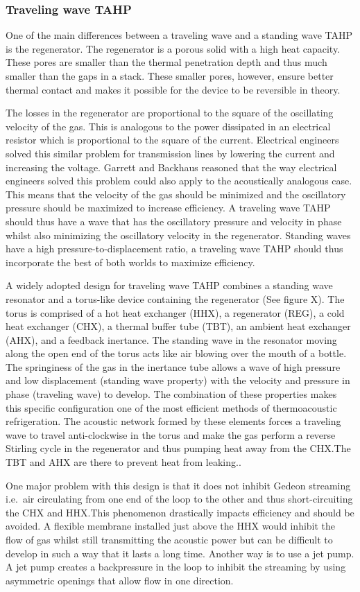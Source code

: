 \documentclass{article}
\newcommand{\newpara}
    {
      \bigbreak{}
      \noindent
    }
\begin{document}
\subsubsection{Traveling wave TAHP\cite{TARTIBU2019102}}
One of the main differences between a traveling wave and a standing wave TAHP is the regenerator. The regenerator is a porous solid with a high heat capacity. These pores are smaller than the thermal penetration depth and thus much smaller than the gaps in a stack. These smaller pores, however, ensure better thermal contact and makes it possible for the device to be reversible in theory.
\newpara{}
The losses in the regenerator are proportional to the square of the oscillating velocity of the gas. This is analogous to the power dissipated in an electrical resistor which is proportional to the square of the current. Electrical engineers solved this similar problem for transmission lines by lowering the current and increasing the voltage. Garrett and Backhaus\cite{powerofsound} reasoned that the way electrical engineers solved this problem could also apply to the acoustically analogous case. This means that the velocity of the gas should be minimized and the oscillatory pressure should be maximized to increase efficiency. A traveling wave TAHP should thus have a wave that has the oscillatory pressure and velocity in phase whilst also minimizing the oscillatory velocity in the regenerator. Standing waves have a high pressure-to-displacement ratio, a traveling wave TAHP should thus incorporate the best of both worlds to maximize efficiency.
\newpara{}
A widely adopted design for traveling wave TAHP combines a standing wave resonator and a torus-like device containing the regenerator (See figure X). The torus is comprised of a hot heat exchanger (HHX), a regenerator (REG), a cold heat exchanger (CHX), a thermal buffer tube (TBT), an ambient heat exchanger (AHX), and a feedback inertance. The standing wave in the resonator moving along the open end of the torus acts like air blowing over the mouth of a bottle. The springiness of the gas in the inertance tube allows a wave of high pressure and low displacement (standing wave property) with the velocity and pressure in phase (traveling wave) to develop. The combination of these properties makes this specific configuration one of the most efficient methods of thermoacoustic refrigeration. The acoustic network formed by these elements forces a traveling wave to travel anti-clockwise in the torus and make the gas perform a reverse Stirling cycle in the regenerator and thus pumping heat away from the CHX.\@ The TBT and AHX are there to prevent heat from leaking.\cite{TijaniAHighPerformanceThermoacousticEngine}.
\newpara{}
One major problem with this design is that it does not inhibit Gedeon streaming i.e.\ air circulating from one end of the loop to the other and thus short-circuiting the CHX and HHX.\@ This phenomenon drastically impacts efficiency and should be avoided. A flexible membrane installed just above the HHX would inhibit the flow of gas whilst still transmitting the acoustic power but can be difficult to develop in such a way that it lasts a long time. Another way is to use a jet pump. A jet pump creates a backpressure in the loop to inhibit the streaming by using asymmetric openings that allow flow in one direction.
\end{document}
